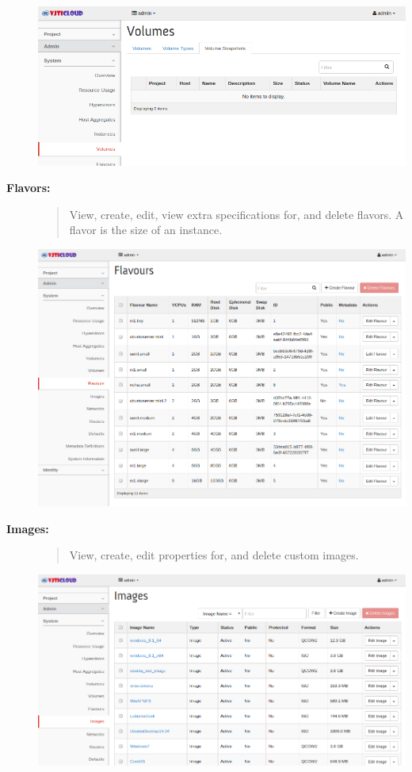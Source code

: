 \documentclass[letterpaper,10pt,english]{sphinxmanual}
\begin{document}
\begin{description}
\includegraphics{sys_volume_snapshots.png}

\item[{\textbf{Flavors:}}] \leavevmode\begin{quote}

View, create, edit, view extra specifications for, and delete flavors. A flavor is the size of an instance.
\end{quote}

\includegraphics{sys_flavours.png}

\item[{\textbf{Images:}}] \leavevmode\begin{quote}

View, create, edit properties for, and delete custom images.
\end{quote}

\includegraphics{sys_images.png}


\end{description}
\end{document}
